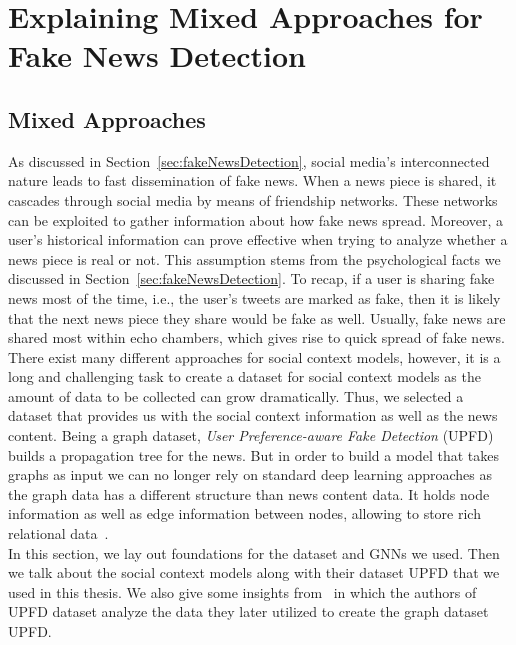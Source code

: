 
\chapter{Explaining Mixed Approaches for Fake News Detection}

\section{Mixed Approaches}
\label{sec:mixedApproaches}
As discussed in Section~\ref{sec:fakeNewsDetection}, social media's interconnected nature leads to fast dissemination of
fake news. When a news piece is shared, it cascades through social media by means of friendship networks. These networks
can be exploited to gather information about how fake news spread. Moreover, a user's historical information can prove effective when trying to analyze whether a news piece is real or not. This assumption stems from the psychological facts we discussed in Section~\ref{sec:fakeNewsDetection}. To recap, if a user is sharing fake news most of the time, i.e., the user's tweets are marked as fake, then it is likely that the next news piece they share would be fake as well. Usually, fake news are shared most within echo chambers, which gives rise to quick spread of fake news.\\
There exist many different approaches for social context models, however, it is a long and challenging task to create a dataset for social context models as the amount of data to be collected can grow dramatically. Thus, we selected a dataset that provides us with the social context information as well as the news content. Being a graph dataset, \emph{User Preference-aware Fake Detection} (UPFD)~\parencite{UPFD_Dataset_Shu} builds a propagation tree for the news. But in order to build a model that takes graphs as input we can no longer rely on standard deep learning approaches as the graph data has a different structure than news content data. It holds node information as well as edge information between nodes, allowing to store rich relational data~\parencite{UPFD_Dataset_Shu}.\\
In this section, we lay out foundations for the dataset and GNNs we used. Then we talk about the social context models along with their dataset UPFD that we used in this thesis. We also give some insights from~\parencite{HierarchicalPropagationNetworksForFND_Shu} in which the authors of UPFD dataset analyze the data they later utilized to create the graph dataset UPFD.\\

